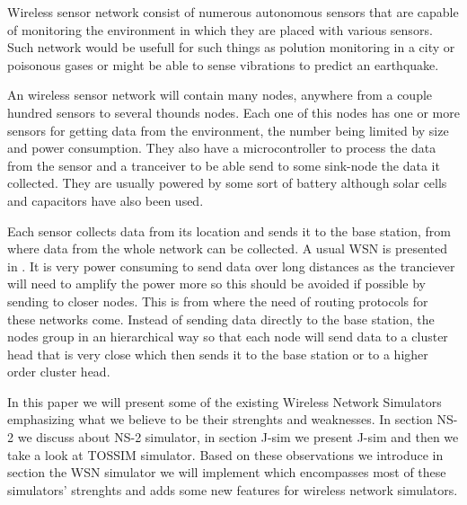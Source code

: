
Wireless sensor network consist of numerous autonomous sensors that are
capable of monitoring the environment in which they are placed with various
sensors. Such network would be usefull for such things as polution monitoring
in a city or poisonous gases or might be able to sense vibrations to predict
an earthquake. 

An wireless sensor network will contain many nodes, anywhere from a couple
hundred sensors to several thounds nodes. Each one of this nodes has one or
more sensors for getting data from the environment, the number being limited
by size and power consumption. They also have a microcontroller to process the
data from the sensor and a tranceiver to be able send to some sink-node the
data it collected. They are usually powered by some sort of battery although
solar cells and capacitors have also been used.

Each sensor collects data from its location and sends it to the base station,
from where data from the whole network can be collected. A usual WSN is
presented in . It is very power
consuming to send data over long distances as the tranciever will need to
amplify the power more so this should be avoided if possible by sending to
closer nodes. This is from where the need of routing protocols for these
networks come. Instead of sending data directly to the base station, the nodes
group in an hierarchical way so that each node will send data to a cluster
head that is very close which then sends it to the base station or to a higher
order cluster head.


In this paper we will present some of the existing Wireless Network
Simulators emphasizing what we believe to be their strenghts and weaknesses. 
In section NS-2 we discuss about NS-2 simulator, in section J-sim we present
J-sim and then we take a look at TOSSIM simulator. Based on these observations
we introduce in section \codename  the WSN simulator we will implement which
encompasses most of these simulators' strenghts and adds some new features
for wireless network simulators.
